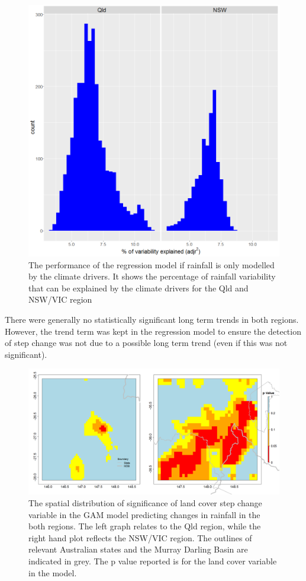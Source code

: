 \documentclass[fleqn,10pt,lineno]{wlpeerj} %
\theoremstyle{definition}
\theoremstyle{definition}
\theoremstyle{definition}
\theoremstyle{remark}
\begin{document}
\begin{figure}
\includegraphics[width=0.7\linewidth]{figures/soi_explhistogram} \caption{The performance of the regression model if rainfall is only modelled by the climate drivers. It shows the percentage of rainfall variability that can be explained by the climate drivers for the Qld and NSW/VIC region}\label{fig:rsq}
\end{figure}

There were generally no statistically significant long term trends in
both regions. However, the trend term was kept in the regression model
to ensure the detection of step change was not due to a possible long
term trend (even if this was not significant).

\begin{figure}
\includegraphics[width=0.9\linewidth]{figures/Cp_30yrs} \caption{The spatial distribution of significance of land cover step change variable in the GAM model predicting changes in rainfall in the both regions. The left graph relates to the Qld region, while the right hand plot reflects the NSW/VIC region. The outlines of relevant Australian states and the Murray Darling Basin are indicated in grey.  The p value reported is for the land cover variable in the model.}\label{fig:LCp}
\end{figure}
\end{document}
